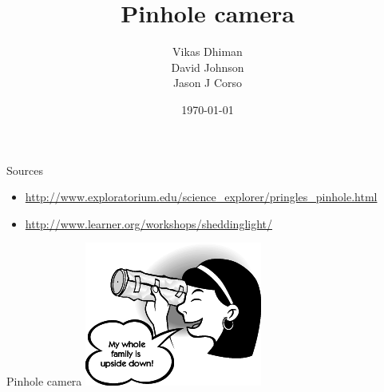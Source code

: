 % 
%

%


\title{Pinhole camera}
\date{\today}
\author{Vikas Dhiman\\ David Johnson\\ Jason J Corso}


\maketitle
\begin{frame}{Sources}
  \begin{itemize}
    \item 
      \url{http://www.exploratorium.edu/science_explorer/pringles_pinhole.html}
    \item
      \url{http://www.learner.org/workshops/sheddinglight/}
  \end{itemize}
\end{frame}
\begin{frame}{Pinhole camera}
  \centering
  \includegraphics{media/girl_looks.png}
\end{frame}

